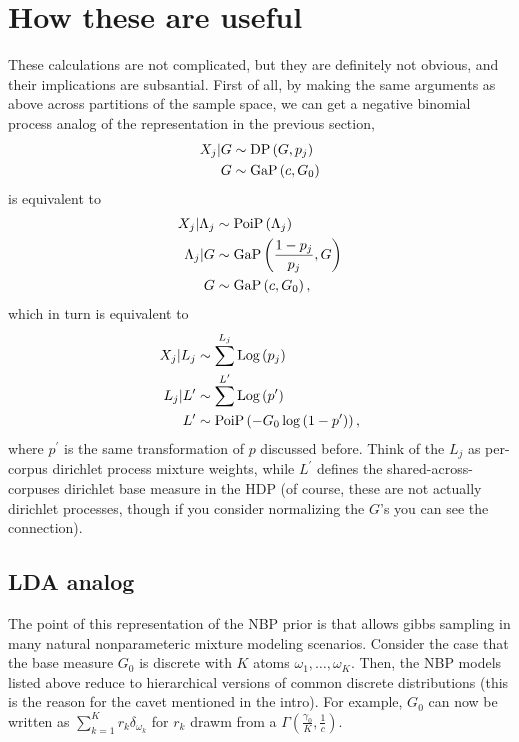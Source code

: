 \documentclass{article}
\begin{document}
\section{How these are useful}

These calculations are not complicated, but they are definitely not obvious, and
their implications are subsantial. First of all, by making the same arguments as
above across partitions of the sample space, we can get a negative binomial
process analog of the representation in the previous section,
\begin{align}
  X_{j} \vert G &\sim \textnormal{DP}\left(G, p_{j}\right) \\
  G &\sim \textnormal{GaP}\left(c, G_{0}\right)
\end{align}
is equivalent to
\begin{align}
  X_{j} \vert \Lambda_{j} &\sim \textnormal{PoiP}\left(\Lambda_{j}\right) \\
  \Lambda_{j} \vert G &\sim \textnormal{GaP}\left(\frac{1 - p_{j}}{p_{j}}, G\right) \\
  G &\sim \textnormal{GaP}\left(c, G_{0}\right),
\end{align}
which in turn is equivalent to
\begin{align}
  X_{j} \vert L_{j} &\sim \sum^{L_{j}} \textnormal{Log}\left(p_{j}\right) \\
  L_{j} \vert L^{\prime} &\sim \sum^{L^{\prime}} \textnormal{Log}\left(p^{\prime}\right) \\
  L^{\prime} &\sim \textnormal{PoiP}\left(-G_{0}\log\left(1 - p^{\prime}\right)\right),
\end{align}
where $p^{\prime}$ is the same transformation of $p$ discussed before. Think of
the $L_{j}$ as per-corpus dirichlet process mixture weights, while $L^{\prime}$
defines the shared-across-corpuses dirichlet base measure in the HDP (of course,
these are not actually dirichlet processes, though if you consider normalizing
the $G$'s you can see the connection).

\subsection{LDA analog}

The point of this representation of the NBP prior is that allows gibbs sampling
in many natural nonparameteric mixture modeling scenarios. Consider the case
that the base measure $G_{0}$ is discrete with $K$ atoms $\omega_{1}, \dots,
\omega_{K}$. Then, the NBP models listed above reduce to hierarchical versions
of common discrete distributions (this is the reason for the cavet mentioned in
the intro). For example, $G_{0}$ can now be written as $\sum_{k = 1}^{K} r_{k}
\delta_{\omega_{k}}$ for $r_{k}$ drawm from a $\Gamma\left(\frac{\gamma_{0}}{K},
\frac{1}{c}\right)$.
\end{document}
